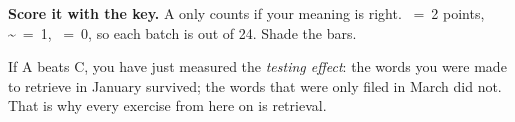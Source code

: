 \documentclass[11pt,a4paper]{article}
\newcommand{\hfont}{\fontfamily{pag}\selectfont}
\newcommand{\uifont}{\sffamily}
\newcommand{\num}[1]{\leavevmode{\uifont\bfseries\small\color{accent}#1}}
\newcommand{\blank}[1][1.25cm]{\textcolor{mute}{\rule[-0.45ex]{#1}{0.5pt}}}
\newcommand{\word}[1]{{\uifont\bfseries\color{ink}#1}}
\begin{document}
\noindent\begin{minipage}[c]{0.56\linewidth}
{\small\textbf{Score it with the key.} A  only counts if your meaning is right. ~=~2 points, \textasciitilde~=~1, ~=~0, so each batch is out of 24. Shade the bars.}
\par\vspace{1.5mm}
{\small\color{inksoft}If A beats C, you have just measured the \emph{testing effect}: the words you were made to retrieve in January survived; the words that were only filed in March did not. That is why every exercise from here on is retrieval.}
\end{minipage}\hfill
\begin{minipage}[c]{0.4\linewidth}\centering
{}
\end{minipage}

\newcommand{\dq}[5]{%
  \begin{minipage}[t]{\linewidth}\RaggedRight
  \num{#1}\enspace\word{#2}\par\vspace{0.5mm}
  {\small\begin{tabular}{@{}l@{\ }p{0.88\linewidth}@{}}
  {\uifont\bfseries\scriptsize\color{mute}a} & #3\\
  {\uifont\bfseries\scriptsize\color{mute}b} & #4\\
  {\uifont\bfseries\scriptsize\color{mute}c} & #5\\
  \end{tabular}}\par
  {\scriptsize\color{mute}decoys:}\ \blank[2.2cm]\ {\scriptsize\color{mute}/}\ \blank[2.2cm]
  \end{minipage}\par\vspace{3.2mm}}
\end{document}
